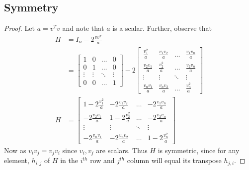 \documentclass[12pt]{article}
\begin{document}
		\subsection{Symmetry}
		\begin{proof}
			Let $ a= v^Tv $ and note that $ a $ is a scalar. Further, observe that \begin{align*}
			 H&= I_{n}-2 \frac{v v^{T}}{a} \\
			 &= \begin{bmatrix}
			 1 & 0 & \dots & 0 \\
			 0 & 1 & \dots & 0 \\
			 \vdots & \vdots & \ddots & \vdots \\
			 0 & 0 & \dots &1
			 \end{bmatrix} - 2\begin{bmatrix}
			 \frac{v_1^2}{a} & \frac{v_1v_2}{a} & \dots & \frac{v_1v_n}{a}\\
			 \frac{v_2v_1}{a} & \frac{v_2^2}{a} & \dots & \frac{v_2v_n}{a} \\
			 \vdots & \vdots & \ddots & \vdots \\
			 \frac{v_nv_1}{a} & \frac{v_nv_2}{a} & \dots & \frac{v_n^2}{a}
			 \end{bmatrix} \\
			 H &= \begin{bmatrix}
			 1-2\frac{v_1^2}{a} & -2\frac{v_1v_2}{a} & \dots & -2\frac{v_1v_n}{a}\\
			 -2\frac{v_2v_1}{a} & 1-2\frac{v_2^2}{a} & \dots & -2\frac{v_2v_n}{a} \\
			 \vdots & \vdots & \ddots & \vdots \\
			 -2\frac{v_nv_1}{a} & -2\frac{v_nv_2}{a} & \dots & 1-2\frac{v_n^2}{a}
			 \end{bmatrix}
			\end{align*}
		Now as $ v_iv_j=v_jv_i $ since $ v_i,v_j $ are scalars. Thus $ H $ is symmetric, since for any element, $ h_{i,j} $ of $ H $ in the $ i^{th} $ row and $ j^{th} $ column will equal its transpose $ h_{j,i} $.
		\end{proof}
\end{document}
